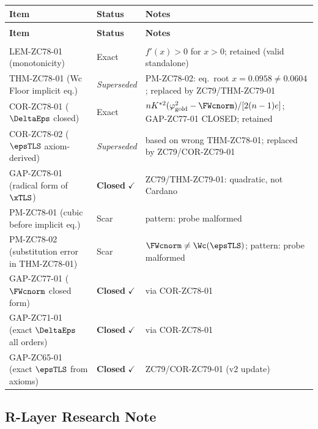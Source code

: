 \documentclass[12pt, a4paper]{article}
\begin{document}
{\small
\setlength{\LTpre}{4pt}\setlength{\LTpost}{4pt}
\renewcommand{\arraystretch}{1.30}
\begin{longtable}{>{\raggedright\arraybackslash}p{5.2cm}
                  >{\centering\arraybackslash}p{2.4cm}
                  >{\raggedright\arraybackslash}p{5.0cm}}
\toprule
\textbf{Item} & \textbf{Status} & \textbf{Notes} \\
\midrule
\endfirsthead
\multicolumn{3}{l}{\small\textit{(continued)}}\\[4pt]
\toprule\textbf{Item}&\textbf{Status}&\textbf{Notes}\\\midrule
\endhead
\midrule\multicolumn{3}{r}{\small\textit{(continues)}}\\
\endfoot
\bottomrule
\endlastfoot
LEM-ZC78-01 (monotonicity)
  & Exact & $f'(x)>0$ for $x>0$; retained (valid standalone) \\[4pt]
THM-ZC78-01 (Wc Floor implicit eq.)
  & \textit{Superseded} & PM-ZC78-02: eq.\ root $x=0.0958\neq 0.0604$;
    replaced by ZC79/THM-ZC79-01 \\[4pt]
COR-ZC78-01 ($\DeltaEps$ closed)
  & Exact & $nK^{*2}(\varphi_{\rm gold}^2 - \FWcnorm)/[2(n-1)e]$;
    GAP-ZC77-01 CLOSED; retained \\[4pt]
COR-ZC78-02 ($\epsTLS$ axiom-derived)
  & \textit{Superseded} & based on wrong THM-ZC78-01;
    replaced by ZC79/COR-ZC79-01 \\[4pt]
GAP-ZC78-01 (radical form of $\xTLS$)
  & \textbf{Closed} $\checkmark$ & ZC79/THM-ZC79-01: quadratic, not Cardano \\[4pt]
PM-ZC78-01 (cubic before implicit eq.)
  & Scar & pattern: probe malformed \\[4pt]
PM-ZC78-02 (substitution error in THM-ZC78-01)
  & Scar & $\FWcnorm \neq \Wc(\epsTLS)$;
    pattern: probe malformed \\[4pt]
\midrule
GAP-ZC77-01 ($\FWcnorm$ closed form)
  & \textbf{Closed} $\checkmark$ & via COR-ZC78-01 \\[4pt]
GAP-ZC71-01 (exact $\DeltaEps$ all orders)
  & \textbf{Closed} $\checkmark$ & via COR-ZC78-01 \\[4pt]
GAP-ZC65-01 (exact $\epsTLS$ from axioms)
  & \textbf{Closed} $\checkmark$ & ZC79/COR-ZC79-01 (v2 update) \\
\bottomrule
\end{longtable}
}

\subsection{R-Layer Research Note}
\label{sec:rlayer}
\end{document}

